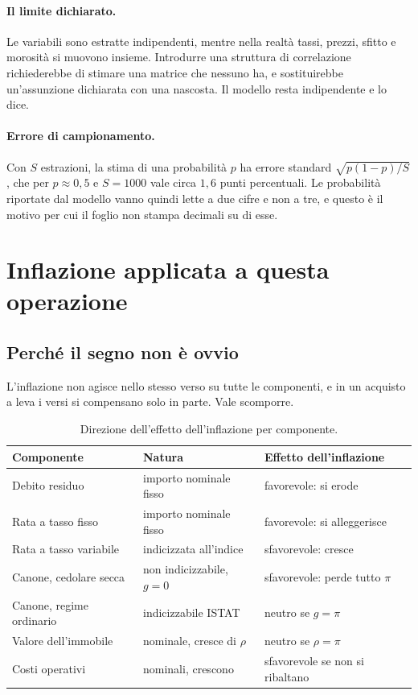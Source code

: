 \documentclass[11pt,a4paper]{article}
\theoremstyle{definition}
\theoremstyle{plain}
\begin{document}
\paragraph{Il limite dichiarato.} Le variabili sono estratte indipendenti, mentre nella realtà tassi, prezzi, sfitto e morosità si muovono insieme. Introdurre una struttura di correlazione richiederebbe di stimare una matrice che nessuno ha, e sostituirebbe un'assunzione dichiarata con una nascosta. Il modello resta indipendente e lo dice.

\paragraph{Errore di campionamento.} Con $S$ estrazioni, la stima di una probabilità $p$ ha errore standard $\sqrt{p(1-p)/S}$, che per $p\approx 0{,}5$ e $S=1000$ vale circa $1{,}6$ punti percentuali. Le probabilità riportate dal modello vanno quindi lette a due cifre e non a tre, e questo è il motivo per cui il foglio non stampa decimali su di esse.

\section{Inflazione applicata a questa operazione}
\label{sec:inflazione}

\subsection{Perché il segno non è ovvio}

L'inflazione non agisce nello stesso verso su tutte le componenti, e in un acquisto a leva i versi si compensano solo in parte. Vale scomporre.

\begin{table}[H]
\centering
\small
\begin{tabular}{@{}lll@{}}
\toprule
Componente & Natura & Effetto dell'inflazione \\
\midrule
Debito residuo & importo nominale fisso & favorevole: si erode \\
Rata a tasso fisso & importo nominale fisso & favorevole: si alleggerisce \\
Rata a tasso variabile & indicizzata all'indice & sfavorevole: cresce \\
Canone, cedolare secca & non indicizzabile, $g=0$ & sfavorevole: perde tutto $\pi$ \\
Canone, regime ordinario & indicizzabile ISTAT & neutro se $g=\pi$ \\
Valore dell'immobile & nominale, cresce di $\rho$ & neutro se $\rho=\pi$ \\
Costi operativi & nominali, crescono & sfavorevole se non si ribaltano \\
\bottomrule
\end{tabular}
\caption{Direzione dell'effetto dell'inflazione per componente.}
\end{table}
\end{document}
